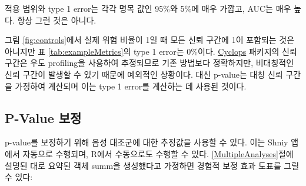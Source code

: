 \documentclass[10.5pt]{book}
\newenvironment{Shaded}{\begin{snugshade}}{\end{snugshade}}
\newcommand{\KeywordTok}[1]{\textcolor[rgb]{0.13,0.29,0.53}{\textbf{#1}}}
\newcommand{\DataTypeTok}[1]{\textcolor[rgb]{0.13,0.29,0.53}{#1}}
\newcommand{\StringTok}[1]{\textcolor[rgb]{0.31,0.60,0.02}{#1}}
\newcommand{\CommentTok}[1]{\textcolor[rgb]{0.56,0.35,0.01}{\textit{#1}}}
\newcommand{\OtherTok}[1]{\textcolor[rgb]{0.56,0.35,0.01}{#1}}
\newcommand{\OperatorTok}[1]{\textcolor[rgb]{0.81,0.36,0.00}{\textbf{#1}}}
\newcommand{\NormalTok}[1]{#1}
\theoremstyle{definition}
\theoremstyle{definition}
\theoremstyle{definition}
\theoremstyle{remark}
\begin{document}
적용 범위와 type 1 error는 각각 명목 값인 95\%와 5\%에 매우 가깝고,
AUC는 매우 높다. 항상 그런 것은 아니다.

그림 \ref{fig:controls}에서 실제 위험 비율이 1일 때 모든 신뢰 구간에 1이
포함되는 것은 아니지만 표 \ref{tab:exampleMetrics}의 type 1 error는
0\%이다. \href{https://ohdsi.github.io/Cyclops/}{Cyclops} 패키지의 신뢰
구간은 우도 profiling을 사용하여 추정되므로 기존 방법보다 정확하지만,
비대칭적인 신뢰 구간이 발생할 수 있기 때문에 예외적인 상황이다. 대신
p-value는 대칭 신뢰 구간을 가정하여 계산되며 이는 type 1 error를
계산하는 데 사용된 것이다.

\subsection{P-Value 보정}\label{p-value--1}

p-value를 보정하기 위해 음성 대조군에 대한 추정값을 사용할 수 있다. 이는
Shniy 앱에서 자동으로 수행되며, R에서 수동으로도 수행할 수 있다.
\ref{MultipleAnalyses}절에 설명된 대로 요약된 객체 summ을 생성했다고
가정하면 경험적 보정 효과 도표를 그릴 수 있다:

\begin{Shaded}
\end{Shaded}
\end{document}
